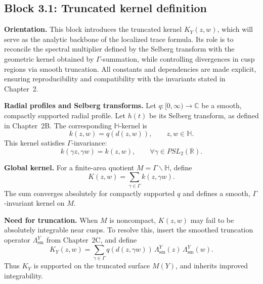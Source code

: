 
\subsection{Block 3.1: Truncated kernel definition}\label{block:3.1}

\noindent
\textbf{Orientation.}
This block introduces the truncated kernel $K_{Y}(z,w)$,
which will serve as the analytic backbone of the localized trace formula.
Its role is to reconcile the spectral multiplier defined by the Selberg transform
with the geometric kernel obtained by $\Gamma$-summation,
while controlling divergences in cusp regions via smooth truncation.
All constants and dependencies are made explicit,
ensuring reproducibility and compatibility with the invariants stated in Chapter~2.

\medskip

\noindent\textbf{Radial profiles and Selberg transforms.}
Let $q:[0,\infty)\to\mathbb{C}$ be a smooth, compactly supported radial profile.
Let $h(t)$ be its Selberg transform, as defined in Chapter~2B.
The corresponding $\mathbb{H}$-kernel is
\[
  k(z,w) = q(d(z,w)), \qquad z,w\in\mathbb{H}.
\]
This kernel satisfies $\Gamma$-invariance:
\[
  k(\gamma z,\gamma w) = k(z,w), \qquad \forall \gamma\in PSL_{2}(\mathbb{R}).
\]

\medskip

\noindent\textbf{Global kernel.}
For a finite-area quotient $M=\Gamma\backslash\mathbb{H}$,
define
\[
  K(z,w) = \sum_{\gamma\in\Gamma} k(z,\gamma w).
\]
The sum converges absolutely for compactly supported $q$
and defines a smooth, $\Gamma$-invariant kernel on $M$.

\medskip

\noindent\textbf{Need for truncation.}
When $M$ is noncompact,
$K(z,w)$ may fail to be absolutely integrable near cusps.
To resolve this,
insert the smoothed truncation operator $\Lambda^{Y}_{\mathrm{sm}}$ from Chapter~2C,
and define
\begin{equation}\label{eq:KY-def}
  K_{Y}(z,w) = \sum_{\gamma\in\Gamma} q(d(z,\gamma w))\,
  \Lambda^{Y}_{\mathrm{sm}}(z)\,\Lambda^{Y}_{\mathrm{sm}}(w).
\end{equation}
Thus $K_{Y}$ is supported on the truncated surface $M(Y)$,
and inherits improved integrability.

\medskip

